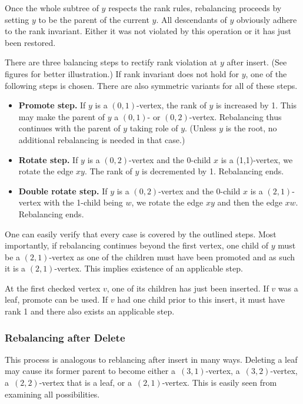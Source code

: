 Once the whole subtree of $y$ respects the rank rules, rebalancing proceeds by setting $y$ to be the parent of the current $y$. All descendants of $y$ obviously adhere to the rank invariant. Either it was not violated by this operation or it has just been restored. 

There are three balancing steps to rectify rank violation at $y$ after insert. (See figures for better illustration.) If rank invariant does not hold for $y$, one of the following steps is chosen. There are also symmetric variants for all of these steps. 

\begin{itemize}
	\item \textbf{Promote step.} If $y$ is a $(0,1)$-vertex, the rank of $y$ is increased by 1. This may make the parent of $y$ a $(0,1)$- or $(0,2)$-vertex. Rebalancing thus continues with the parent of $y$ taking role of $y$. (Unless $y$ is the root, no additional rebalancing is needed in that case.)
	\item \textbf{Rotate step.} If $y$ is a $(0,2)$-vertex and the 0-child $x$ is a (1,1)-vertex, we rotate the edge $xy$. The rank of $y$ is decremented by 1. Rebalancing ends.
	\item \textbf{Double rotate step.} If $y$ is a $(0,2)$-vertex and the 0-child $x$ is a $(2,1)$-vertex with the 1-child being $w$, we rotate the edge $xy$ and then the edge $xw$. Rebalancing ends.
\end{itemize}

One can easily verify that every case is covered by the outlined steps. Most importantly, if rebalancing continues beyond the first vertex, one child of $y$ must be a $(2,1)$-vertex as one of the children must have been promoted and as such it is a $(2,1)$-vertex. This implies existence of an applicable step. 

At the first checked vertex $v$, one of its children has just been inserted. If $v$ was a leaf, promote can be used. If $v$ had one child prior to this insert, it must have rank 1 and there also exists an applicable step. 



\subsubsection*{Rebalancing after Delete}

This process is analogous to reblancing after insert in many ways. Deleting a leaf may cause its former parent to become either a~$(3,1)$-vertex, a~$(3,2)$-vertex, a~$(2,2)$-vertex that is a leaf, or a~$(2,1)$-vertex. This is easily seen from examining all possibilities. 

